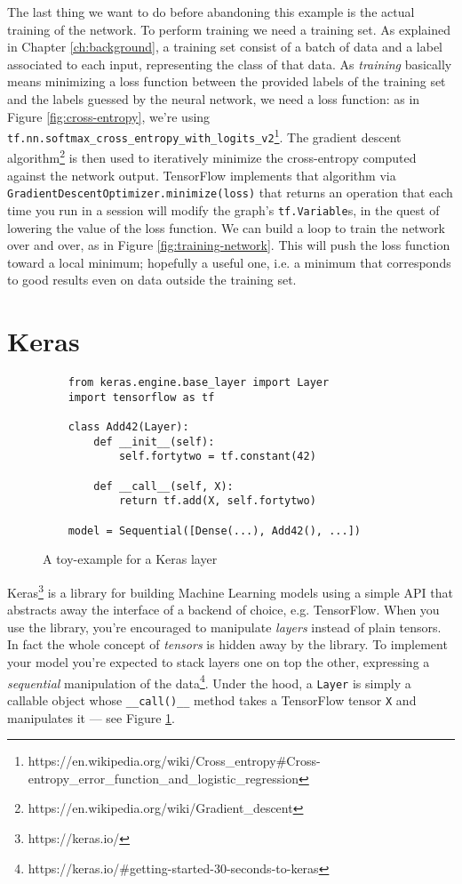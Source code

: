 The last thing we want to do before abandoning this example is the
actual training of the network. To perform training we need a training
set. As explained in Chapter \ref{ch:background}, a training set
consist of a batch of data and a label associated to each input,
representing the class of that data. As \emph{training} basically means
minimizing a loss function between the provided labels of the training
set and the labels guessed by the neural network, we need a loss
function: as in Figure \ref{fig:cross-entropy}, we're using
\texttt{tf.nn.softmax\_cross\_entropy\_with\_logits\_v2}\footnote{https://en.wikipedia.org/wiki/Cross\_entropy\#Cross-entropy\_error\_function\_and\_logistic\_regression}.
The gradient descent
algorithm\footnote{https://en.wikipedia.org/wiki/Gradient\_descent} is
then used to iteratively minimize the cross-entropy computed against
the network output. TensorFlow implements that algorithm via
\texttt{GradientDescentOptimizer.minimize(loss)} that returns an operation
that each time you run in a session will modify the graph's
\texttt{tf.Variable}s, in the quest of lowering the value of the loss
function. We can build a loop to train the network over and over, as in
Figure \ref{fig:training-network}. This will push the loss function
toward a local minimum; hopefully a useful one, i.e. a minimum that
corresponds to good results even on data outside the training set.

\section{Keras}
\label{sec:keras}

\begin{figure}
  \begin{verbatim}
    from keras.engine.base_layer import Layer
    import tensorflow as tf

    class Add42(Layer):
        def __init__(self):
            self.fortytwo = tf.constant(42)

        def __call__(self, X):
            return tf.add(X, self.fortytwo)

    model = Sequential([Dense(...), Add42(), ...])
  \end{verbatim}
  \caption{A toy-example for a Keras layer}
  \label{fig:toy-layer}
\end{figure}

Keras\footnote{https://keras.io/} is a library for building Machine
Learning models using a simple API that abstracts away the interface of
a backend of choice, e.g. TensorFlow. When you use the library, you're
encouraged to manipulate \emph{layers} instead of plain tensors. In
fact the whole concept of \emph{tensors} is hidden away by the library.
To implement your model you're expected to stack layers one on top the
other, expressing a \emph{sequential} manipulation of the
data\footnote{https://keras.io/\#getting-started-30-seconds-to-keras}.
Under the hood, a \texttt{Layer} is simply a callable object whose
\texttt{\_\_call()\_\_} method takes a TensorFlow tensor \texttt{X} and
manipulates it --- see Figure \ref{fig:toy-layer}.

